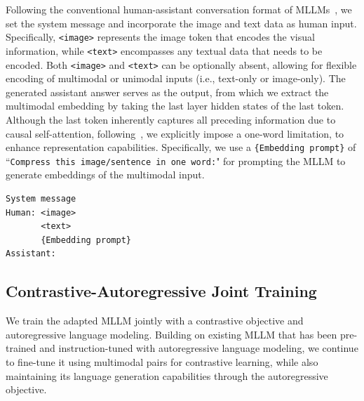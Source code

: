 Following the conventional human-assistant conversation format of MLLMs~\citep{liu2024visual}, we set the system message and incorporate the image and text data as human input. 
%
Specifically, \texttt{<image>} represents the image token that encodes the visual information, while \texttt{<text>} encompasses any textual data that needs to be encoded.
%
Both \texttt{<image>} and \texttt{<text>} can be optionally absent, allowing for flexible encoding of multimodal or unimodal inputs (i.e., text-only or image-only). 
%
The generated assistant answer serves as the output, from which we extract the multimodal embedding by taking the last layer hidden states of the last token. 
%
Although the last token inherently captures all preceding information due to causal self-attention, following~\citet{jiang2023scaling}, we explicitly impose a one-word limitation, to enhance representation capabilities. 
%
Specifically, we use a \texttt{\{Embedding prompt\}} of ``\texttt{Compress this image/sentence in one word:}" for prompting the MLLM to generate embeddings of the multimodal input.
%
\begin{table}[t]
\centering
\begin{tcolorbox}[colback=yellow!20, colframe=black, arc=2mm]
\begin{verbatim}
System message
Human: <image> 
       <text>
       {Embedding prompt} 
Assistant: 
\end{verbatim}
\end{tcolorbox}
\caption{The embedding instruction used to generate multimodal embeddings with MLLMs. \texttt{<image>} and \texttt{<text>} represents the image token and text input, respectively. \texttt{\{Embedding prompt\}} is the prompt used for instructing the MLLM to generate the multimodal embedding. }
\label{tab:prompt}
\vspace{-0.2in}
\end{table}
%

\subsection{Contrastive-Autoregressive Joint Training}
We train the adapted MLLM jointly with a contrastive objective and autoregressive language modeling. 
%
Building on existing MLLM that has been pre-trained and instruction-tuned with autoregressive language modeling, we continue to fine-tune it using multimodal pairs for contrastive learning, while also maintaining its language generation capabilities through the autoregressive objective.
%

